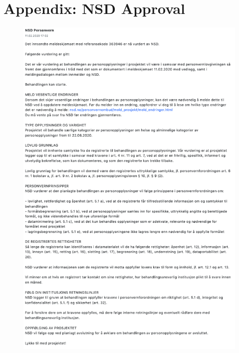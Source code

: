 \chapter{Appendix: NSD Approval}

\begin{figure}
    \centering
    \includegraphics[width=1\textwidth]{images/NSDapproval.png}
\end{figure}
\label{nsd}